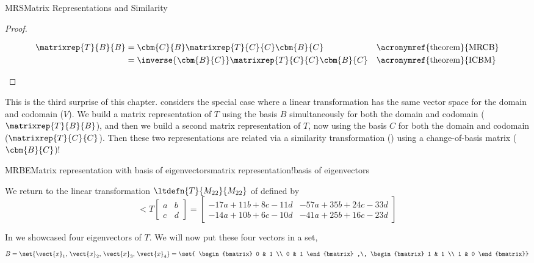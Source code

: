 \begin{subsect}{MRS}{Matrix Representations and Similarity}
\begin{proof}
\begin{para}
%
\begin{align*}
\matrixrep{T}{B}{B}
&=\cbm{C}{B}\matrixrep{T}{C}{C}\cbm{B}{C}&&\text{\acronymref{theorem}{MRCB}}\\
&=\inverse{\cbm{B}{C}}\matrixrep{T}{C}{C}\cbm{B}{C}&&\text{\acronymref{theorem}{ICBM}}
\end{align*}
\end{para}
%
\end{proof}
%
\begin{para}This is the third surprise of this chapter.   considers the special case where a linear transformation has the same vector space for the domain and codomain ($V$).  We build a matrix representation of $T$ using the basis $B$ simultaneously for both the domain and codomain ($\matrixrep{T}{B}{B}$), and then we build a second matrix representation of $T$, now using the basis $C$ for both the domain and codomain ($\matrixrep{T}{C}{C}$).  Then these two representations are related via a similarity transformation () using a change-of-basis matrix ($\cbm{B}{C}$)!\end{para}
%
%
\begin{example}{MRBE}{Matrix representation with basis of eigenvectors}{matrix representation!basis of eigenvectors}
\begin{para}We return to the linear transformation $\ltdefn{T}{M_{22}}{M_{22}}$ of  defined by
%
\begin{equation*}
\lt{T}{\begin{bmatrix}a&b\\c&d\end{bmatrix}}
=
\begin{bmatrix}
-17a+11b+8c-11d
&
-57a+35b+24c-33d
\\
-14a+10b+6c-10d
&
-41a+25b+16c-23d
\end{bmatrix}
\end{equation*}
\end{para}
%
\begin{para}In  we showcased four eigenvectors of $T$.  We will now put these four vectors in a set,
%
\begin{equation*}
B=\set{\vect{x}_1,\,\vect{x}_2,\,\vect{x}_3,\,\vect{x}_4}
=\set{
\begin{bmatrix}
 0 & 1 \\ 0 & 1
\end{bmatrix}
,\,
\begin{bmatrix}
 1 & 1 \\ 1 & 0

\end{bmatrix}}
\end{equation*}
\end{para}
\end{example}
\end{subsect}
